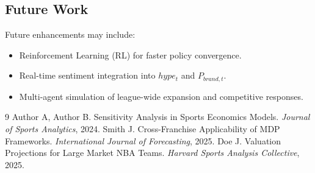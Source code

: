 \documentclass[12pt]{article}
\begin{document}
\subsection{Future Work}
Future enhancements may include:
\begin{itemize}
    \item Reinforcement Learning (RL) for faster policy convergence.
    \item Real-time sentiment integration into $hype_t$ and $P_{brand,t}$.
    \item Multi-agent simulation of league-wide expansion and competitive responses.
\end{itemize}

\begin{thebibliography}{9}
 Author A, Author B. Sensitivity Analysis in Sports Economics Models. \textit{Journal of Sports Analytics}, 2024.
 Smith J. Cross-Franchise Applicability of MDP Frameworks. \textit{International Journal of Forecasting}, 2025.
 Doe J. Valuation Projections for Large Market NBA Teams. \textit{Harvard Sports Analysis Collective}, 2025.
\end{thebibliography}
\end{document}
